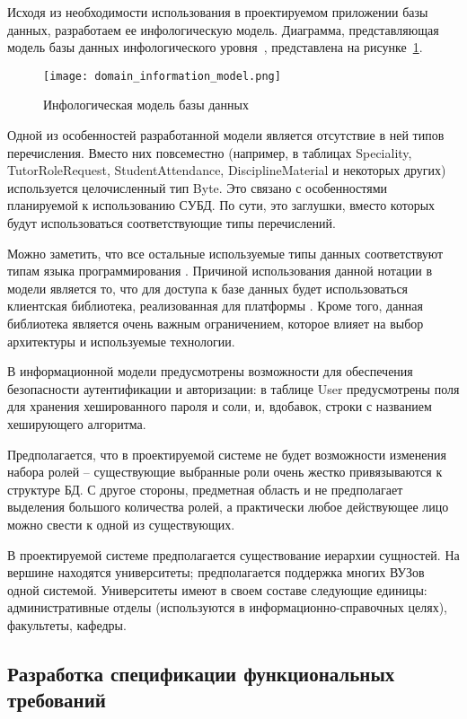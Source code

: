 Исходя из необходимости использования в проектируемом приложении базы данных, разработаем ее инфологическую модель. Диаграмма, представляющая модель базы данных инфологического уровня~\cite{kulikov_db_workbook}, представлена на рисунке~\ref{fig:domain:model:db:model}.

\begin{figure}
\centering
	\texttt{[image: domain\_information\_model.png]}
	\caption{Инфологическая модель базы данных}
	\label{fig:domain:model:db:model}
\end{figure}

Одной из особенностей разработанной модели является отсутствие в ней типов перечисления. Вместо них повсеместно (например, в таблицах Speciality, TutorRoleRequest, StudentAttendance, DisciplineMaterial и некоторых других) используется целочисленный тип Byte. Это связано с особенностями планируемой к использованию СУБД. По сути, это заглушки, вместо которых будут использоваться соответствующие типы перечислений.

Можно заметить, что все остальные используемые типы данных соответствуют типам языка программирования \csharp. Причиной использования данной нотации в модели является то, что для доступа к базе данных будет использоваться клиентская библиотека, реализованная для платформы \dotnet. Кроме того, данная библиотека является очень важным ограничением, которое влияет на выбор архитектуры и используемые технологии.

В информационной модели предусмотрены возможности для обеспечения безопасности аутентификации и авторизации: в таблице User предусмотрены поля для хранения хешированного пароля и соли, и, вдобавок, строки с названием хеширующего алгоритма.

Предполагается, что в проектируемой системе не будет возможности изменения набора ролей -- существующие выбранные роли очень жестко привязываются к структуре БД. С другое стороны, предметная область и не предполагает выделения большого количества ролей, а практически любое действующее лицо можно свести к одной из существующих.

В проектируемой системе предполагается существование иерархии сущностей. На вершине находятся университеты; предполагается поддержка многих ВУЗов одной системой. Университеты имеют в своем составе следующие единицы: административные отделы (используются в информа\-ционно-справочных целях), факультеты, кафедры.

\subsection{Разработка спецификации функциональных требований}
\label{sec:domain:specification}

